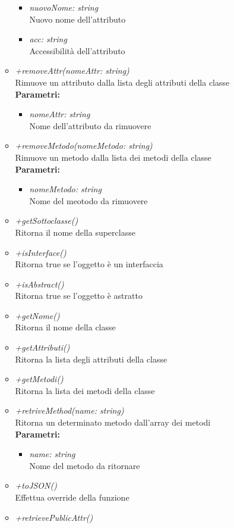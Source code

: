 \begin{itemize}
\begin{itemize}
\begin{itemize}
    			\item \emph{nuovoNome: string}\\
    			Nuovo nome dell'attributo
    			\item \emph{acc: string}\\
    			Accessibilità dell'attributo
    		\end{itemize}
    		\item \emph{+removeAttr(nomeAttr: string)}\\
    		Rimuove un attributo dalla lista degli attributi della classe\\
    		\textbf{Parametri:}
    		\begin{itemize}
    			\item \emph{nomeAttr: string}\\
    			Nome dell'attributo da rimuovere
    		\end{itemize}
    		\item \emph{+removeMetodo(nomeMetodo: string)}\\
    		Rimuove un metodo dalla lista dei metodi della classe\\
    		\textbf{Parametri:}
    		\begin{itemize}
    			\item \emph{nomeMetodo: string}\\
    			Nome del meotodo da rimuovere
    		\end{itemize}
    		\item \emph{+getSottoclasse() }\\
    		Ritorna il nome della superclasse
    		\item \emph{+isInterface()}\\
    		Ritorna true se l'oggetto è un interfaccia
    		\item \emph{+isAbstract()}\\
    		Ritorna true se l'oggetto è astratto
    		\item \emph{+getNome()}\\
    		Ritorna il nome della classe
    		\item \emph{+getAttributi()}\\
    		Ritorna la lista degli attributi della classe
    		\item \emph{+getMetodi()}\\
    		Ritorna la lista dei metodi della classe
    		\item \emph{+retriveMethod(name: string)}\\
    		Ritorna un determinato metodo dall'array dei metodi\\
    		\textbf{Parametri:}
    		\begin{itemize}
    			\item \emph{name: string}\\
    			Nome del metodo da ritornare
    		\end{itemize}
    		\item \emph{+toJSON()}\\
    		Effettua override della funzione 
    		\item \emph{+retrievePublicAttr()}\\
    		

\end{itemize}
\end{itemize}
